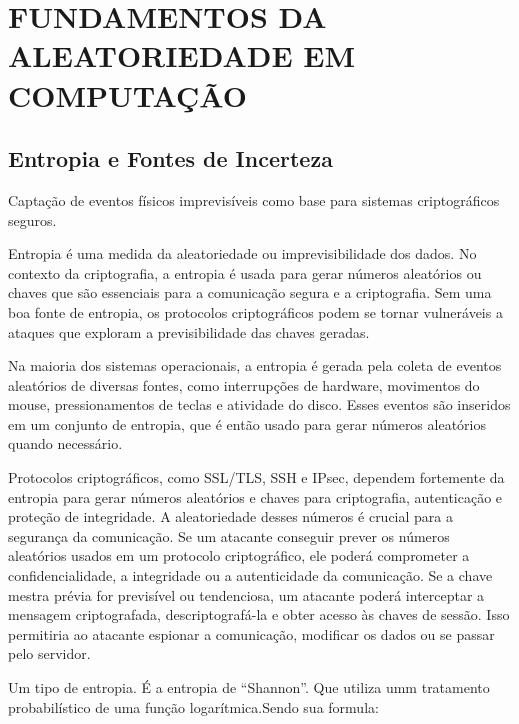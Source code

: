 \chapter{FUNDAMENTOS DA ALEATORIEDADE EM COMPUTAÇÃO} %


    \section{Entropia e Fontes de Incerteza}

        Captação de eventos físicos imprevisíveis como base para sistemas criptográficos seguros.

        Entropia é uma medida da aleatoriedade ou imprevisibilidade dos dados. 
        No contexto da criptografia, a entropia é usada para gerar 
        números aleatórios ou chaves que são essenciais para a comunicação segura e a criptografia. 
        Sem uma boa fonte de entropia, os protocolos criptográficos podem se tornar vulneráveis a ataques 
        que exploram a previsibilidade das chaves geradas.

        Na maioria dos sistemas operacionais, 
        a entropia é gerada pela coleta de eventos aleatórios de diversas fontes, 
        como interrupções de hardware, movimentos do mouse, 
        pressionamentos de teclas e atividade do disco. 
        Esses eventos são inseridos em um conjunto de entropia, 
        que é então usado para gerar números aleatórios quando necessário.

        Protocolos criptográficos, como SSL/TLS, SSH e IPsec, 
        dependem fortemente da entropia para gerar números aleatórios e chaves para criptografia, 
        autenticação e proteção de integridade.
        A aleatoriedade desses números é crucial para a segurança da comunicação. 
        Se um atacante conseguir prever os números aleatórios usados em um protocolo criptográfico, 
        ele poderá comprometer a confidencialidade, a integridade ou a autenticidade da comunicação.
        Se a chave mestra prévia for previsível ou tendenciosa, 
        um atacante poderá interceptar a mensagem criptografada, 
        descriptografá-la e obter acesso às chaves de sessão. 
        Isso permitiria ao atacante espionar a comunicação, 
        modificar os dados ou se passar pelo servidor.

        Um tipo de entropia. É a entropia de ``Shannon''. Que utiliza umm tratamento probabilístico
        de uma função logarítmica.Sendo sua formula: %


